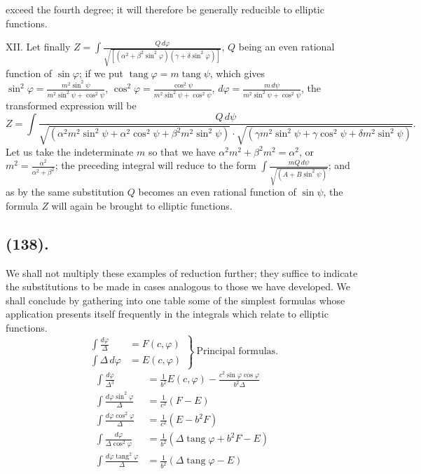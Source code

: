 \documentclass{article}
\begin{document}
exceed the fourth degree; it will therefore be generally reducible to elliptic functions.

XII. Let finally $Z=\displaystyle\int\frac{Q\,d\varphi}{\sqrt{[(\alpha^{2}+\beta^{2}\sin^{2}\varphi)(\gamma+\delta\sin^{2}\varphi)]}}$, $Q$ being an even rational function of $\sin\varphi$; if we put $\operatorname{tang}\varphi=m\operatorname{tang}\psi$, which gives $\sin^{2}\varphi=\frac{m^{2}\sin^{2}\psi}{m^{2}\sin^{2}\psi+\cos^{2}\psi}$, $\cos^{2}\varphi=\frac{\cos^{2}\psi}{m^{2}\sin^{2}\psi+\cos^{2}\psi}$, $d\varphi=\frac{m\,d\psi}{m^{2}\sin^{2}\psi+\cos^{2}\psi}$, the transformed expression will be
\[ Z=\int\frac{Q\,d\psi}{\sqrt{(\alpha^{2}m^{2}\sin^{2}\psi+\alpha^{2}\cos^{2}\psi+\beta^{2}m^{2}\sin^{2}\psi)}\cdot\sqrt{(\gamma m^{2}\sin^{2}\psi+\gamma\cos^{2}\psi+\delta m^{2}\sin^{2}\psi)}}. \]
Let us take the indeterminate $m$ so that we have $\alpha^{2}m^{2}+\beta^{2}m^{2}=\alpha^{2}$, or $m^{2}=\frac{\alpha^{2}}{\alpha^{2}+\beta^{2}}$; the preceding integral will reduce to the form $\displaystyle\int\frac{mQ\,d\psi}{\sqrt{(A+B\sin^{2}\psi)}}$; and as by the same substitution $Q$ becomes an even rational function of $\sin\psi$, the formula $Z$ will again be brought to elliptic functions.

\subsection*{(138).}

We shall not multiply these examples of reduction further; they suffice to indicate the substitutions to be made in cases analogous to those we have developed. We shall conclude by gathering into one table some of the simplest formulas whose application presents itself frequently in the integrals which relate to elliptic functions.
\[ \left.\begin{aligned} \int\frac{d\varphi}{\Delta}&=F(c,\varphi)\\ \int\Delta\,d\varphi&=E(c,\varphi) \end{aligned}\right\}\ \text{Principal formulas.} \]
\[ \begin{aligned} \int\frac{d\varphi}{\Delta^{3}}&=\frac{1}{b^{2}}E(c,\varphi)-\frac{c^{2}\sin\varphi\cos\varphi}{b^{2}\Delta}\\ \int\frac{d\varphi\sin^{2}\varphi}{\Delta}&=\frac{1}{c^{2}}(F-E)\\ \int\frac{d\varphi\cos^{2}\varphi}{\Delta}&=\frac{1}{c^{2}}(E-b^{2}F)\\ \int\frac{d\varphi}{\Delta\cos^{2}\varphi}&=\frac{1}{b^{2}}(\Delta\operatorname{tang}\varphi+b^{2}F-E)\\ \int\frac{d\varphi\operatorname{tang}^{2}\varphi}{\Delta}&=\frac{1}{b^{2}}(\Delta\operatorname{tang}\varphi-E) \end{aligned} \]
\end{document}
